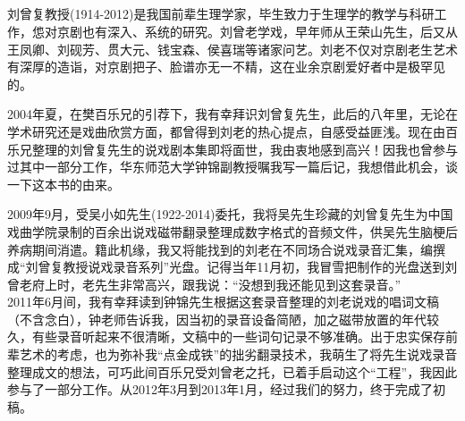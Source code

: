 

\newpage
\pagestyle{fancy}    %
\hypertarget{ux540e-ux8bb0-ux4e0e-ux81f4-ux8c22}{%
	\subsection{}\label{ux540e-ux8bb0-ux4e0e-ux81f4-ux8c22}}
\renewcommand{\thefootnote}{*}                   %
\setlength{\parindent}{24pt}     %
刘曾复教授(1914-2012)是我国前辈生理学家，毕生致力于生理学的教学与科研工作，怹对京剧也有深入、系统的研究。刘曾老学戏，早年师从王荣山先生，后又从王凤卿、刘砚芳、贯大元、钱宝森、侯喜瑞等诸家问艺。刘老不仅对京剧老生艺术有深厚的造诣，对京剧把子、脸谱亦无一不精，这在业余京剧爱好者中是极罕见的。

2004年夏，在樊百乐兄的引荐下，我有幸拜识刘曾复先生，此后的八年里，无论在学术研究还是戏曲欣赏方面，都曾得到刘老的热心提点，自感受益匪浅。现在由百乐兄整理的刘曾复先生的说戏剧本集即将面世，我由衷地感到高兴！因我也曾参与过其中一部分工作，华东师范大学钟锦副教授嘱我写一篇后记，我想借此机会，谈一下这本书的由来。

2009年9月，受吴小如先生(1922-2014)委托，我将吴先生珍藏的刘曾复先生为中国戏曲学院录制的百余出说戏磁带翻录整理成数字格式的音频文件，供吴先生脑梗后养病期间消遣。籍此机缘，我又将能找到的刘老在不同场合说戏录音汇集，编撰成``刘曾复教授说戏录音系列''光盘。记得当年11月初，我冒雪把制作的光盘送到刘曾老府上时，老先生非常高兴，跟我说：``没想到我还能见到这套录音。''\\


2011年6月间，我有幸拜读到钟锦先生根据这套录音整理的刘老说戏的唱词文稿（不含念白），钟老师告诉我，因当初的录音设备简陋，加之磁带放置的年代较久，有些录音听起来不很清晰，文稿中的一些词句记录不够准确。出于忠实保存前辈艺术的考虑，也为弥补我``点金成铁''的拙劣翻录技术，我萌生了将先生说戏录音整理成文的想法，可巧此间百乐兄受刘曾老之托，已着手启动这个``工程''，我因此参与了一部分工作。从2012年3月到2013年1月，经过我们的努力，终于完成了初稿。

